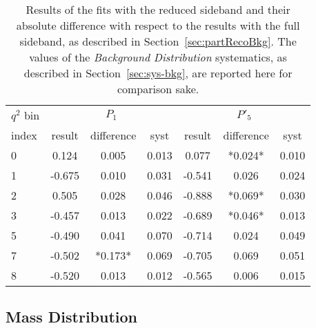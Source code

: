 \begin{table*}[htb]
  \caption{Results of the fits with the reduced sideband and their absolute difference with respect to the results with the full sideband, as described in Section~\ref{sec:partRecoBkg}.
    The values of the \textit{Background Distribution} systematics, as described in Section~\ref{sec:sys-bkg}, are reported here for comparison sake.\label{tab:red-sideband}}
          {\small
            \begin{center}
              \begin{tabular}{l|ccc|ccc}
                $q^2$ bin & \multicolumn{3}{c}{$P_1$} & \multicolumn{3}{c}{$P'_5$} \\
                index & result & difference & syst & result & difference & syst \\
                \hline
                0 &  0.124 & 0.005 & 0.013 &  0.077 &*0.024*& 0.010 \\
                1 & -0.675 & 0.010 & 0.031 & -0.541 & 0.026 & 0.024 \\
                2 &  0.505 & 0.028 & 0.046 & -0.888 &*0.069*& 0.030 \\
                3 & -0.457 & 0.013 & 0.022 & -0.689 &*0.046*& 0.013 \\
                5 & -0.490 & 0.041 & 0.070 & -0.714 & 0.024 & 0.049 \\
                7 & -0.502 &*0.173*& 0.069 & -0.705 & 0.069 & 0.051 \\
                8 & -0.520 & 0.013 & 0.012 & -0.565 & 0.006 & 0.015 \\
              \end{tabular}
            \end{center}
          }
\end{table*}



\subsection{Mass Distribution}
\label{sec:sys-mass distribution}



